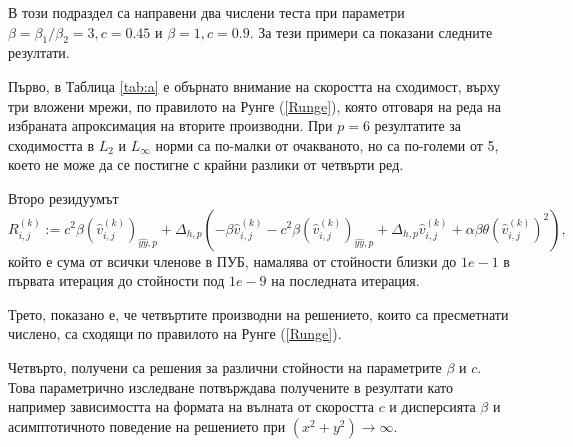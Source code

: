 \documentclass[a5paper]{article}
\newcommand{\rf}[1]{(\ref{#1})}
\theoremstyle{remark}
\begin{document}
\begin{large}
В този подраздел са направени два числени теста при параметри $\beta = \beta_1/\beta_2 = 3, c=0.45$ и $\beta = 1, c=0.9$. За тези примери са показани следните резултати. 

Първо, в Таблица \ref{tab:a} е обърнато внимание на скоростта на сходимост, върху три вложени мрежи, по правилото на Рунге \rf{Runge}, която отговаря на реда на избраната апроксимация на вторите производни. При $p=6$ резултатите за сходимостта в $L_2$ и $L_\infty$ норми са по-малки от очакваното, но са по-големи от 5, което не може да се постигне с крайни разлики от четвърти ред. 

Второ резидуумът
\begin{equation*}\label{residual}
R_{i,j}^{(k)} := 
c^2\beta (\widehat{v}^{(k)}_{i,j})_{\widehat{yy},p} + \Delta_{h,p}(-\beta \widehat{v}^{(k)}_{i,j} - c^2\beta (\widehat{v}^{(k)}_{i,j})_{\widehat{yy},p} + \Delta_{h,p} \widehat{v}^{(k)}_{i,j} 
+ \alpha \beta \theta (\widehat{v}^{(k)}_{i,j})^2  ),
\end{equation*}
който е сума от всички членове в ПУБ, намалява от стойности близки до $1e-1$ в първата итерация до стойности под $1e-9$ на последната итерация. 

Трето, показано е, че четвъртите производни на решението, които са пресметнати числено, са сходящи по правилото на Рунге \rf{Runge}. 

Четвърто, получени са решения за различни стойности на параметрите $\beta$ и $c$. Това параметрично изследване потвърждава получените в \cite{ref15, ref116} резултати като например зависимостта на формата на вълната от скоростта $c$ и дисперсията $\beta$ и асимптотичното поведение на решението при $(x^2 + y^2) \rightarrow \infty$. 


\end{large}
\end{document}
